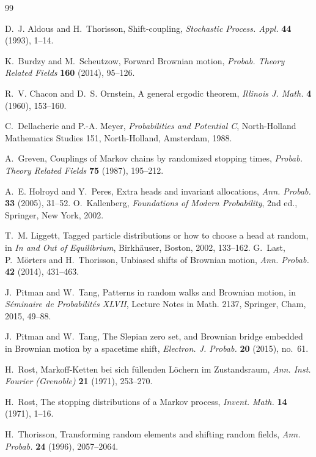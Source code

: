 \documentclass[11pt]{amsart}
\theoremstyle{remark}
\numberwithin{equation}{section}
\begin{document}
\begin{thebibliography}{99}

 D.~J. Aldous and H.~Thorisson, Shift-coupling, \emph{Stochastic Process. Appl.} \textbf{44} (1993), 1--14.

 K.~Burdzy and M.~Scheutzow, Forward Brownian motion, \emph{Probab. Theory Related Fields} \textbf{160} (2014), 95--126.

 R.~V. Chacon and D.~S. Ornstein, A general ergodic theorem, \emph{Illinois J. Math.} \textbf{4} (1960), 153--160.

 C.~Dellacherie and P.-A. Meyer, \emph{Probabilities and Potential C}, North-Holland Mathematics Studies 151, North-Holland, Amsterdam, 1988.

 A.~Greven, Couplings of Markov chains by randomized stopping times, \emph{Probab. Theory Related Fields} \textbf{75} (1987), 195--212.

 A.~E. Holroyd and Y.~Peres, Extra heads and invariant allocations, \emph{Ann. Probab.} \textbf{33} (2005), 31--52.
 O.~Kallenberg, \emph{Foundations of Modern Probability}, 2nd ed., Springer, New York, 2002.

 T.~M. Liggett, Tagged particle distributions or how to choose a head at random, in \emph{In and Out of Equilibrium}, Birkh\"auser, Boston, 2002, 133--162.
 G.~Last, P.~M\"orters and H.~Thorisson, Unbiased shifts of Brownian motion, \emph{Ann. Probab.} \textbf{42} (2014), 431--463.

 J.~Pitman and W.~Tang, Patterns in random walks and Brownian motion, in \emph{S\'eminaire de Probabilit\'es XLVII}, Lecture Notes in Math. 2137, Springer, Cham, 2015, 49--88.

 J.~Pitman and W.~Tang, The Slepian zero set, and Brownian bridge embedded in Brownian motion by a spacetime shift, \emph{Electron. J. Probab.} \textbf{20} (2015), no.~61.

 H.~Rost, Markoff-Ketten bei sich f\"ullenden L\"ochern im Zustandsraum, \emph{Ann. Inst. Fourier (Grenoble)} \textbf{21} (1971), 253--270.

 H.~Rost, The stopping distributions of a Markov process, \emph{Invent. Math.} \textbf{14} (1971), 1--16.

 H.~Thorisson, Transforming random elements and shifting random fields, \emph{Ann. Probab.} \textbf{24} (1996), 2057--2064.


\end{thebibliography}
\end{document}
